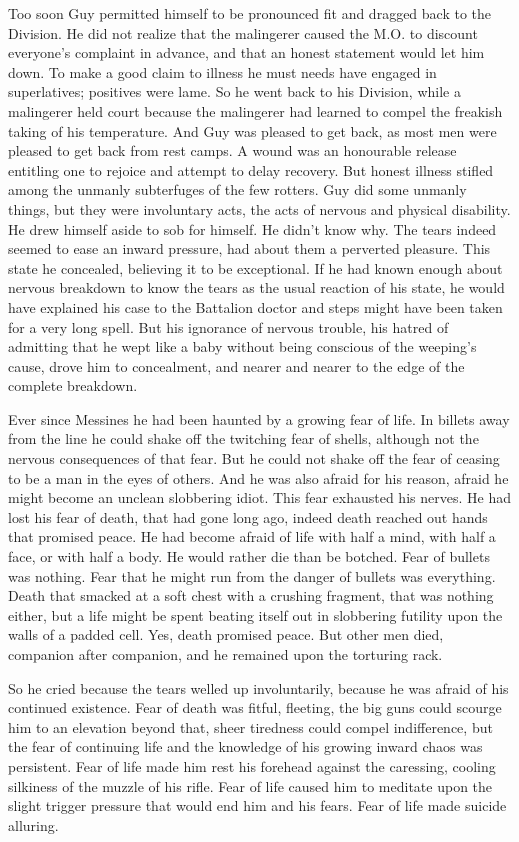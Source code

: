 Too soon Guy permitted himself to be pronounced fit and dragged back to the Division. He did not realize that the malingerer caused the M.O. to discount everyone's complaint in advance, and that an honest statement would let him down. To make a good claim to illness he must needs have engaged in superlatives; positives were lame. So he went back to his Division, while a malingerer held court because the malingerer had learned to compel the freakish taking of his temperature. And Guy was pleased to get back, as most men were pleased to get back from rest camps. A wound was an honourable release entitling one to rejoice and attempt to delay recovery. But honest illness stifled among the unmanly subterfuges of the few rotters. Guy did some unmanly things, but they were involuntary acts, the acts of nervous and physical disability. He drew himself aside to sob for himself. He didn't know why. The tears indeed seemed to ease an inward pressure, had about them a perverted pleasure. This state he concealed, believing it to be exceptional. If he had known enough about nervous breakdown to know the tears as the usual reaction of his state, he would have explained his case to the Battalion doctor and steps might have been taken for a very long spell. But his ignorance of nervous trouble, his hatred of admitting that he wept like a baby without being conscious of the weeping's cause, drove him to concealment, and nearer and nearer to the edge of the complete breakdown.

Ever since Messines he had been haunted by a growing fear of life. In billets away from the line he could shake off the twitching fear of shells, although not the nervous consequences of that fear. But he could not shake off the fear of ceasing to be a man in the eyes of others. And he was also afraid for his reason, afraid he might become an unclean slobbering idiot. This fear exhausted his nerves. He had lost his fear of death, that had gone long ago, indeed death reached out hands that promised peace. He had become afraid of life with half a mind, with half a face, or with half a body. He would rather die than be botched. Fear of bullets was nothing. Fear that he might run from the danger of bullets was everything. Death that smacked at a soft chest with a crushing fragment, that was nothing either, but a life might be spent beating itself out in slobbering futility upon the walls of a padded cell. Yes, death promised peace. But other men died, companion after companion, and he remained upon the torturing rack.

So he cried because the tears welled up involuntarily, because he was afraid of his continued existence. Fear of death was fitful, fleeting, the big guns could scourge him to an elevation beyond that, sheer tiredness could compel indifference, but the fear of continuing life and the knowledge of his growing inward chaos was persistent. Fear of life made him rest his forehead against the caressing, cooling silkiness of the muzzle of his rifle. Fear of life caused him to meditate upon the slight trigger pressure that would end him and his fears. Fear of life made suicide alluring.

